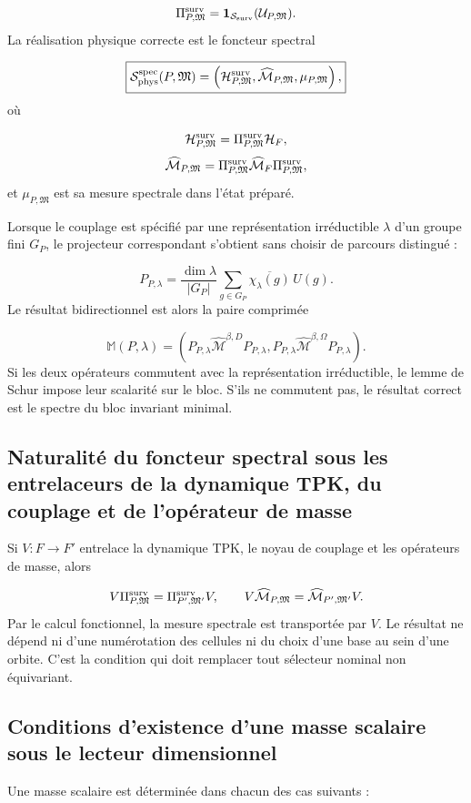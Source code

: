 \[
 \Pi_{P,\mathfrak M}^{\rm surv}
 =\mathbf1_{\mathcal S_{\rm surv}}(\mathcal U_{P,\mathfrak M}).
\]
La réalisation physique correcte est le foncteur spectral

\[
 \boxed{
 \mathcal S_{\rm phys}^{\rm spec}(P,\mathfrak M)
 =\left(
 \mathcal H_{P,\mathfrak M}^{\rm surv},
 \widehat{\mathcal M}_{P,\mathfrak M},
 \mu_{P,\mathfrak M}
 \right),}
\]
où

\[
 \mathcal H_{P,\mathfrak M}^{\rm surv}
 =\Pi_{P,\mathfrak M}^{\rm surv}\mathcal H_F,
\]
\[
 \widehat{\mathcal M}_{P,\mathfrak M}
 =\Pi_{P,\mathfrak M}^{\rm surv}
  \widehat{\mathcal M}_F
  \Pi_{P,\mathfrak M}^{\rm surv},
\]
et \(\mu_{P,\mathfrak M}\) est sa mesure spectrale dans l'état préparé.

Lorsque le couplage est spécifié par une représentation irréductible \(\lambda\) d'un groupe fini \(G_P\), le projecteur correspondant s'obtient sans choisir de parcours distingué :

\[
 P_{P,\lambda}
 =\frac{\dim\lambda}{|G_P|}
  \sum_{g\in G_P}\overline{\chi_\lambda(g)}\,U(g).
\]
Le résultat bidirectionnel est alors la paire comprimée

\[
 \mathbb M(P,\lambda)=
 \left(
 P_{P,\lambda}\widehat{\mathcal M}^{\beta,D}P_{P,\lambda},
 P_{P,\lambda}\widehat{\mathcal M}^{\beta,\Omega}P_{P,\lambda}
 \right).
\]
Si les deux opérateurs commutent avec la représentation irréductible, le lemme de Schur impose leur scalarité sur le bloc. S'ils ne commutent pas, le résultat correct est le spectre du bloc invariant minimal.

\subsection{Naturalité du foncteur spectral sous les entrelaceurs de la dynamique TPK, du couplage et de l'opérateur de masse}
Si \(V:F\to F'\) entrelace la dynamique TPK, le noyau de couplage et les opérateurs de masse, alors

\[
 V\Pi_{P,\mathfrak M}^{\rm surv}
 =\Pi_{P',\mathfrak M'}^{\rm surv}V,
 \qquad
 V\widehat{\mathcal M}_{P,\mathfrak M}
 =\widehat{\mathcal M}_{P',\mathfrak M'}V.
\]
Par le calcul fonctionnel, la mesure spectrale est transportée par \(V\). Le résultat ne dépend ni d'une numérotation des cellules ni du choix d'une base au sein d'une orbite. C'est la condition qui doit remplacer tout sélecteur nominal non équivariant.

\subsection{Conditions d'existence d'une masse scalaire sous le lecteur dimensionnel}
Une masse scalaire est déterminée dans chacun des cas suivants :

